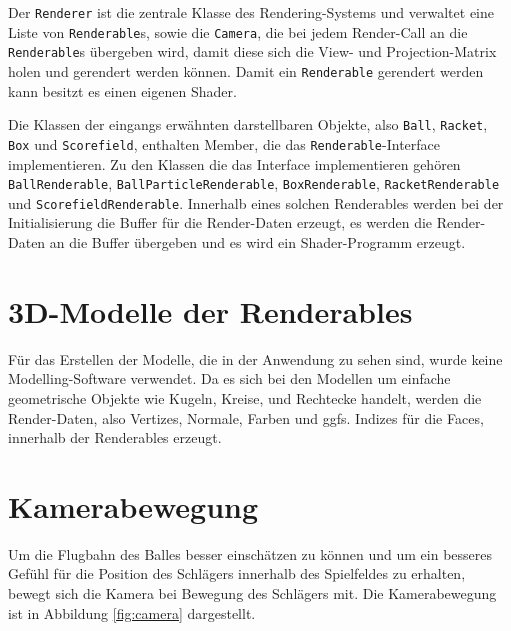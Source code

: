 Der {\texttt{Renderer}} ist die zentrale Klasse des Rendering-Systems und verwaltet eine Liste von {\texttt{Renderable}}s, sowie die {\texttt{Camera}}, die bei jedem Render-Call an die {\texttt{Renderable}}s übergeben wird, damit diese sich die View- und Projection-Matrix holen und gerendert werden können. Damit ein {\texttt{Renderable}} gerendert werden kann besitzt es einen eigenen Shader.

Die Klassen der eingangs erwähnten darstellbaren Objekte, also {\texttt{Ball}}, {\texttt{Racket}}, {\texttt{Box}} und {\texttt{Scorefield}}, enthalten Member, die das {\texttt{Renderable}}-Interface implementieren. Zu den Klassen die das Interface implementieren gehören {\texttt{BallRenderable}}, {\texttt{BallParticleRenderable}},
{\texttt{BoxRenderable}}, {\texttt{RacketRenderable}} und {\texttt{ScorefieldRenderable}}. Innerhalb eines solchen Renderables werden bei der Initialisierung die Buffer für die Render-Daten erzeugt, es werden die Render-Daten an die Buffer übergeben und es wird ein Shader-Programm erzeugt. 

\section{3D-Modelle der Renderables}
%
Für das Erstellen der Modelle, die in der Anwendung zu sehen sind, wurde keine Modelling-Software verwendet. Da es sich bei den Modellen um einfache geometrische Objekte wie Kugeln, Kreise, und Rechtecke handelt, werden die Render-Daten, also Vertizes, Normale, Farben und ggfs. Indizes für die Faces, innerhalb der Renderables erzeugt.

\section{Kamerabewegung}
%
Um die Flugbahn des Balles besser einschätzen zu können und um ein besseres Gefühl für die
Position des Schlägers innerhalb des Spielfeldes zu erhalten, bewegt sich die Kamera bei Bewegung des Schlägers mit. Die Kamerabewegung ist in Abbildung \ref{fig:camera} dargestellt.

